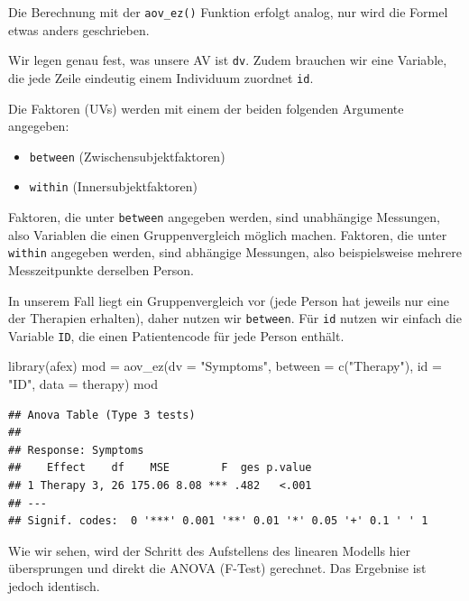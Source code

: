 \documentclass[
]{book}
\newenvironment{Shaded}{\begin{snugshade}}{\end{snugshade}}
\newcommand{\AttributeTok}[1]{\textcolor[rgb]{0.77,0.63,0.00}{#1}}
\newcommand{\FunctionTok}[1]{\textcolor[rgb]{0.00,0.00,0.00}{#1}}
\newcommand{\NormalTok}[1]{#1}
\newcommand{\OtherTok}[1]{\textcolor[rgb]{0.56,0.35,0.01}{#1}}
\newcommand{\StringTok}[1]{\textcolor[rgb]{0.31,0.60,0.02}{#1}}
\providecommand{\tightlist}{%
  \setlength{\itemsep}{0pt}\setlength{\parskip}{0pt}}
\begin{document}
Die Berechnung mit der \texttt{aov\_ez()} Funktion erfolgt analog, nur wird die Formel etwas anders geschrieben.

Wir legen genau fest, was unsere AV ist \texttt{dv}. Zudem brauchen wir eine Variable, die jede Zeile eindeutig einem Individuum zuordnet \texttt{id}.

Die Faktoren (UVs) werden mit einem der beiden folgenden Argumente angegeben:

\begin{itemize}
\tightlist
\item
  \texttt{between} (Zwischensubjektfaktoren)
\item
  \texttt{within} (Innersubjektfaktoren)
\end{itemize}

Faktoren, die unter \texttt{between} angegeben werden, sind unabhängige Messungen, also Variablen die einen Gruppenvergleich möglich machen. Faktoren, die unter \texttt{within} angegeben werden, sind abhängige Messungen, also beispielsweise mehrere Messzeitpunkte derselben Person.

In unserem Fall liegt ein Gruppenvergleich vor (jede Person hat jeweils nur eine der Therapien erhalten), daher nutzen wir \texttt{between}. Für \texttt{id} nutzen wir einfach die Variable \texttt{ID}, die einen Patientencode für jede Person enthält.

\begin{Shaded}
\begin{Highlighting}[]
\FunctionTok{library}\NormalTok{(afex)}
\NormalTok{mod }\OtherTok{=} \FunctionTok{aov\_ez}\NormalTok{(}\AttributeTok{dv =} \StringTok{"Symptoms"}\NormalTok{, }\AttributeTok{between =} \FunctionTok{c}\NormalTok{(}\StringTok{"Therapy"}\NormalTok{), }\AttributeTok{id =} \StringTok{"ID"}\NormalTok{, }\AttributeTok{data =}\NormalTok{ therapy)}
\NormalTok{mod}
\end{Highlighting}
\end{Shaded}

\begin{verbatim}
## Anova Table (Type 3 tests)
## 
## Response: Symptoms
##    Effect    df    MSE        F  ges p.value
## 1 Therapy 3, 26 175.06 8.08 *** .482   <.001
## ---
## Signif. codes:  0 '***' 0.001 '**' 0.01 '*' 0.05 '+' 0.1 ' ' 1
\end{verbatim}

Wie wir sehen, wird der Schritt des Aufstellens des linearen Modells hier übersprungen und direkt die ANOVA (F-Test) gerechnet.
Das Ergebnise ist jedoch identisch.
\end{document}
